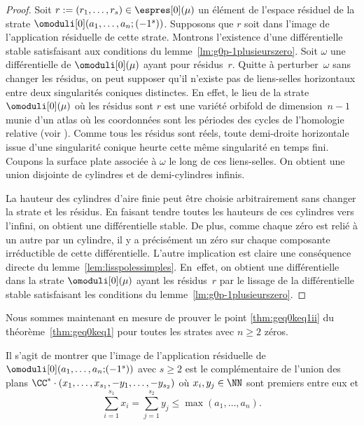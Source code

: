 \begin{proof}
Soit $r:=(r_{1},\dots,r_{s})\in\espres[0](\mu)$ un élément de l'espace résiduel de la strate $\omoduli[0](a_{1},\dots,a_{n};(-1^{s}))$.
Supposons que $r$ soit dans l'image de l'application résiduelle de cette strate. Montrons l'existence d'une différentielle stable satisfaisant aux conditions du lemme~\ref{lm:g0p-1plusieurszero}. Soit $\omega$ une différentielle de $\omoduli[0](\mu)$ ayant pour résidus~$r$. Quitte à perturber~$\omega$ sans changer les résidus, on peut supposer qu'il n'existe pas de liens-selles horizontaux entre deux singularités coniques distinctes. En effet, le lieu de la strate $\omoduli[0](\mu)$ où les résidus sont $r$ est une variété orbifold de dimension~$n-1$ munie d'un atlas où les coordonnées sont les périodes des cycles de l'homologie relative (voir \cite{BCGGM3}). Comme tous les résidus sont réels, toute demi-droite horizontale issue d'une singularité conique heurte cette même singularité en temps fini. Coupons la surface plate associée à $\omega$ le long de ces liens-selles. On obtient une union disjointe de cylindres et de demi-cylindres infinis.

La hauteur des cylindres d'aire finie peut être choisie arbitrairement sans changer la strate et les résidus. En faisant tendre toutes les hauteurs de ces cylindres vers l'infini, on obtient une différentielle stable. De plus, comme chaque zéro est relié à un autre par un cylindre, il y a précisément un zéro sur chaque composante irréductible de cette différentielle.
L'autre implication est claire une conséquence directe du lemme~\ref{lem:lisspolessimples}. En~effet, on obtient une différentielle dans la strate $\omoduli[0](\mu)$ ayant les résidus~$r$ par le lissage de la différentielle stable satisfaisant les conditions du lemme~\ref{lm:g0p-1plusieurszero}.
\end{proof}

Nous sommes maintenant en mesure de prouver le point \eqref{thm:geq0keq1ii} du théorème~\ref{thm:geq0keq1} pour toutes les strates avec $n\geq 2$ zéros.

Il s'agit de montrer que l'image de l'application résiduelle de $\omoduli[0](a_{1},\dots,a_{n};\!(-1^{s}))$ avec $s\geq2$ est le complémentaire de l'union des plans $\CC^{\ast} \cdot (x_{1},\dots,x_{s_{1}},-y_{1},\dots,-y_{s_{2}})$ où $x_{i},y_{j} \in \NN$ sont premiers entre eux et\vspace*{-3pt}
\begin{equation*}
\sum_{i=1}^{s_{1}} x_{i} = \sum_{j=1}^{s_{2}} y_{j} \leq \max(a_{1},\dots,a_{n}).
\end{equation*}

